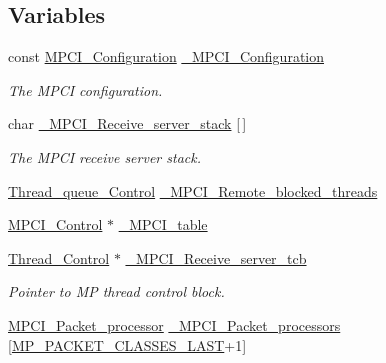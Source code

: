 \subsection*{Variables}
\begin{DoxyCompactItemize}
\item 
const \mbox{\hyperlink{structMPCI__Configuration}{M\+P\+C\+I\+\_\+\+Configuration}} \mbox{\hyperlink{group__RTEMSScoreMPCI_ga311175ff94c266c77baead3ec1c55b01}{\+\_\+\+M\+P\+C\+I\+\_\+\+Configuration}}
\begin{DoxyCompactList}\small\item\em The M\+P\+CI configuration. \end{DoxyCompactList}\item 
char \mbox{\hyperlink{group__RTEMSScoreMPCI_ga1f31c9829798b2fa17bfae6891c93e9f}{\+\_\+\+M\+P\+C\+I\+\_\+\+Receive\+\_\+server\+\_\+stack}} \mbox{[}$\,$\mbox{]}
\begin{DoxyCompactList}\small\item\em The M\+P\+CI receive server stack. \end{DoxyCompactList}\item 
\mbox{\hyperlink{structThread__queue__Control}{Thread\+\_\+queue\+\_\+\+Control}} \mbox{\hyperlink{group__RTEMSScoreMPCI_gab1454472037213316f1ba2a85c29820b}{\+\_\+\+M\+P\+C\+I\+\_\+\+Remote\+\_\+blocked\+\_\+threads}}
\item 
\mbox{\hyperlink{structMPCI__Control}{M\+P\+C\+I\+\_\+\+Control}} $\ast$ \mbox{\hyperlink{group__RTEMSScoreMPCI_ga6b0a65f9ac68015c46d17f17f44a5bd9}{\+\_\+\+M\+P\+C\+I\+\_\+table}}
\item 
\mbox{\hyperlink{struct__Thread__Control}{Thread\+\_\+\+Control}} $\ast$ \mbox{\hyperlink{group__RTEMSScoreMPCI_gac0894f96d2d7e99feb038917fdb3c9cb}{\+\_\+\+M\+P\+C\+I\+\_\+\+Receive\+\_\+server\+\_\+tcb}}
\begin{DoxyCompactList}\small\item\em Pointer to MP thread control block. \end{DoxyCompactList}\item 
\mbox{\hyperlink{group__RTEMSScoreMPCI_gafc97753e25c76740b182f3e8cdf74cc8}{M\+P\+C\+I\+\_\+\+Packet\+\_\+processor}} \mbox{\hyperlink{group__RTEMSScoreMPCI_ga390b6f48eb63a6879d3c3c2fcb38a4e8}{\+\_\+\+M\+P\+C\+I\+\_\+\+Packet\+\_\+processors}} \mbox{[}\mbox{\hyperlink{group__RTEMSScoreMPPacket_ga968e1b3a70aac1692b70ff42f9525bc7}{M\+P\+\_\+\+P\+A\+C\+K\+E\+T\+\_\+\+C\+L\+A\+S\+S\+E\+S\+\_\+\+L\+A\+ST}}+1\mbox{]}
\end{DoxyCompactItemize}


